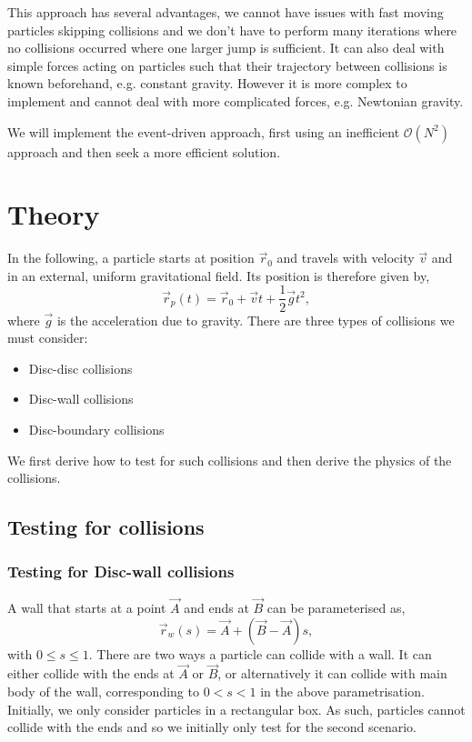 \documentclass{article}
\begin{document}
This approach has several advantages, we cannot have issues with fast moving particles skipping collisions and we don't have to perform many iterations where no collisions occurred where one larger jump is sufficient. It can also deal with simple forces acting on particles such that their trajectory between collisions is known beforehand, e.g. constant gravity. However it is more complex to implement and cannot deal with more complicated forces, e.g. Newtonian gravity.

We will implement the event-driven approach, first using an inefficient $\mathcal{O}(N^2)$ approach and then seek a more efficient solution.

\section{Theory}

In the following, a particle starts at position $\vec{r}_0$ and travels with velocity $\vec{v}$ and in an external, uniform gravitational field. Its position is therefore given by,
\begin{equation}
    \vec{r}_p(t)
    =
    \vec{r}_0 + \vec{v}t + \frac{1}{2} \vec{g} t^2,
\end{equation}
where $\vec{g}$ is the acceleration due to gravity.
There are three types of collisions we must consider:
\begin{itemize}
    \item Disc-disc collisions
    \item Disc-wall collisions
    \item Disc-boundary collisions
\end{itemize}
We first derive how to test for such collisions and then derive the physics of the collisions.

\subsection{Testing for collisions}

\subsubsection{Testing for Disc-wall collisions}
A wall that starts at a point $\vec{A}$ and ends at $\vec{B}$ can be parameterised as,
\begin{equation}
    \vec{r}_w(s)
    =
    \vec{A} + (\vec{B} - \vec{A}) s,
\end{equation}
with $0 \leq s \leq 1$. There are two ways a particle can collide with a wall. It can either collide with the ends at $\vec{A}$ or $\vec{B}$, or alternatively it can collide with main body of the wall, corresponding to $0 < s < 1$ in the above parametrisation. Initially, we only consider particles in a rectangular box. As such, particles cannot collide with the ends and so we initially only test for the second scenario.
\end{document}
